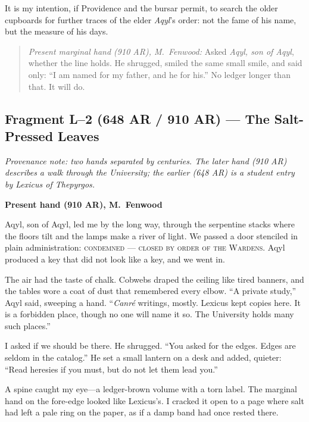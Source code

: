 \documentclass[11pt]{article}
\begin{document}
It is my intention, if Providence and the bursar permit, to search the older cupboards for further traces of the elder \textit{Aqyl}'s order: not the fame of his name, but the measure of his days.

\medskip
\begin{quote}
\textit{Present marginal hand (910 AR), M.\ Fenwood:} Asked \textit{Aqyl, son of Aqyl}, whether the line holds. He shrugged, smiled the same small smile, and said only: ``I am named for my father, and he for his.'' No ledger longer than that. It will do.
\end{quote}

\subsection{Fragment L--2 (648 AR / 910 AR) --- The Salt-Pressed Leaves}
\label{frag:l2}
{}

\noindent\textit{Provenance note: two hands separated by centuries. The later hand (\textit{910 AR}) describes a walk through the University; the earlier (\textit{648 AR}) is a student entry by Lexicus of Thepyrgos.}

\medskip
\noindent\textbf{Present hand (910 AR), M.\ Fenwood}

Aqyl, son of Aqyl, led me by the long way, through the serpentine stacks where the floors tilt and the lamps make a river of light. We passed a door stenciled in plain administration: \textsc{condemned --- closed by order of the Wardens}. Aqyl produced a key that did not look like a key, and we went in.

The air had the taste of chalk. Cobwebs draped the ceiling like tired banners, and the tables wore a coat of dust that remembered every elbow. ``A private study,'' Aqyl said, sweeping a hand. ``\emph{Canr\'e} writings, mostly. Lexicus kept copies here. It is a forbidden place, though no one will name it so. The University holds many such places.''

I asked if we should be there. He shrugged. ``You asked for the edges. Edges are seldom in the catalog.'' He set a small lantern on a desk and added, quieter: ``Read heresies if you must, but do not let them lead you.''

A spine caught my eye---a ledger-brown volume with a torn label. The marginal hand on the fore-edge looked like Lexicus's. I cracked it open to a page where salt had left a pale ring on the paper, as if a damp band had once rested there.
\end{document}
